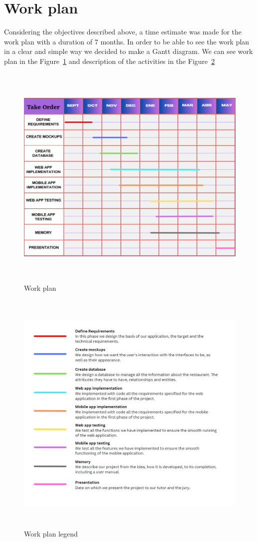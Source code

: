 \section{Work plan}

Considering the objectives described above, a time estimate was made for the work plan with a duration of 7 months. In order to be able to see the work plan in a clear and simple way we decided to make a Gantt diagram.
We can see work plan in the Figure~\ref{fig:Diagrama de Gantt(ingles)} and description of the activities in the Figure~\ref{fig:Leyenda diagrama de Gantt(ingles)}

\begin{figure}[h]
\centering
\includegraphics[width=15cm, height=11cm]{Imagenes/Figuras/Diagrama de Gantt (ingles).png}
\caption{Work plan}\label{fig:Diagrama de Gantt(ingles)}
\end{figure} 


\begin{figure}[h]
\centering
\includegraphics[width=15cm, height=12cm]{Imagenes/Figuras/leyenda Gantt (ingles).png}
\caption{Work plan legend}\label{fig:Leyenda diagrama de Gantt(ingles)}
\end{figure} 








